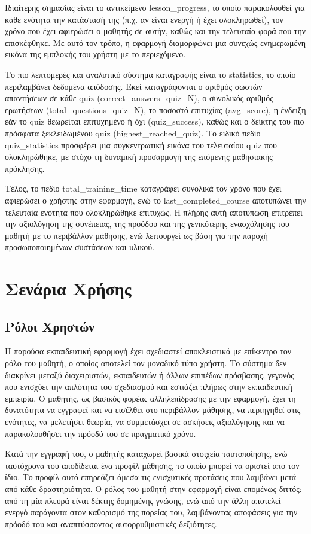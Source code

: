 \documentclass[11pt]{report}
\begin{document}
Ιδιαίτερης σημασίας είναι το αντικείμενο lesson\_progress, το οποίο παρακολουθεί για κάθε ενότητα την κατάστασή της (π.χ. αν είναι ενεργή ή έχει ολοκληρωθεί), τον χρόνο που έχει αφιερώσει ο μαθητής σε αυτήν, καθώς και την τελευταία φορά που την επισκέφθηκε. Με αυτό τον τρόπο, η εφαρμογή διαμορφώνει μια συνεχώς ενημερωμένη εικόνα της εμπλοκής του χρήστη με το περιεχόμενο.

Το πιο λεπτομερές και αναλυτικό σύστημα καταγραφής είναι το statistics, το οποίο περιλαμβάνει δεδομένα απόδοσης. Εκεί καταγράφονται ο αριθμός σωστών απαντήσεων σε κάθε quiz (correct\_answers\_quiz\_N), ο συνολικός αριθμός ερωτήσεων (total\_questions\_quiz\_N), το ποσοστό επιτυχίας (avg\_score), η ένδειξη εάν το quiz θεωρείται επιτυχημένο ή όχι (quiz\_success), καθώς και ο δείκτης του πιο πρόσφατα ξεκλειδωμένου quiz (highest\_reached\_quiz). Το ειδικό πεδίο quiz\_statistics προσφέρει μια συγκεντρωτική εικόνα του τελευταίου quiz που ολοκληρώθηκε, με στόχο τη δυναμική προσαρμογή της επόμενης μαθησιακής πρόκλησης.

Τέλος, το πεδίο total\_training\_time καταγράφει συνολικά τον χρόνο που έχει αφιερώσει ο χρήστης στην εφαρμογή, ενώ το last\_completed\_course αποτυπώνει την τελευταία ενότητα που ολοκληρώθηκε επιτυχώς. Η πλήρης αυτή αποτύπωση επιτρέπει την αξιολόγηση της συνέπειας, της προόδου και της γενικότερης ενασχόλησης του μαθητή με το περιβάλλον μάθησης, ενώ λειτουργεί ως βάση για την παροχή προσωποποιημένων συστάσεων και υλικού.

\chapter{Σενάρια Χρήσης}
\section{Ρόλοι Χρηστών}

Η παρούσα εκπαιδευτική εφαρμογή έχει σχεδιαστεί αποκλειστικά με επίκεντρο τον ρόλο του μαθητή, ο οποίος αποτελεί τον μοναδικό τύπο χρήστη. Το σύστημα δεν διακρίνει μεταξύ διαχειριστών, εκπαιδευτών ή άλλων επιπέδων πρόσβασης, γεγονός που ενισχύει την απλότητα του σχεδιασμού και εστιάζει πλήρως στην εκπαιδευτική εμπειρία. Ο μαθητής, ως βασικός φορέας αλληλεπίδρασης με την εφαρμογή, έχει τη δυνατότητα να εγγραφεί και να εισέλθει στο περιβάλλον μάθησης, να περιηγηθεί στις ενότητες, να μελετήσει θεωρία, να συμμετάσχει σε ασκήσεις αξιολόγησης και να παρακολουθήσει την πρόοδό του σε πραγματικό χρόνο. 

Κατά την εγγραφή του, ο μαθητής καταχωρεί βασικά στοιχεία ταυτοποίησης, ενώ ταυτόχρονα του αποδίδεται ένα προφίλ μάθησης, το οποίο μπορεί να οριστεί από τον ίδιο. Το προφίλ αυτό επηρεάζει άμεσα τις ενισχυτικές προτάσεις που λαμβάνει μετά από κάθε δραστηριότητα. Ο ρόλος του μαθητή στην εφαρμογή είναι επομένως διττός: από τη μία πλευρά είναι δέκτης δομημένης γνώσης, ενώ από την άλλη αποτελεί ενεργό παράγοντα στον καθορισμό της πορείας του, λαμβάνοντας αποφάσεις για την πρόοδό του και αναπτύσσοντας αυτορρυθμιστικές δεξιότητες. 
\end{document}
